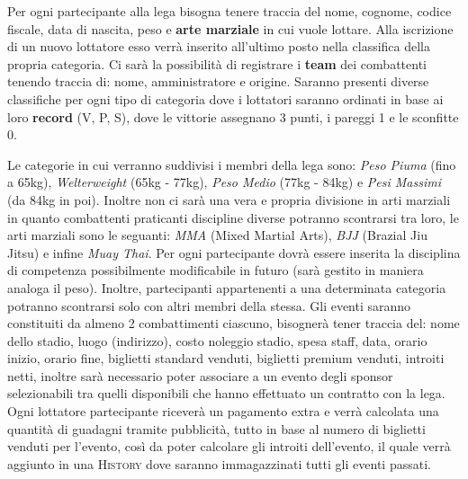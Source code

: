\documentclass[a4paper,12pt]{report}
\begin{document}
Per ogni partecipante alla lega bisogna tenere traccia del nome, cognome, codice fiscale, data di nascita, peso e \textbf{arte 
marziale} in cui vuole lottare. Alla iscrizione di un nuovo lottatore esso verrà inserito all'ultimo 
posto nella classifica della propria categoria. Ci sarà la possibilità di registrare i \textbf{team} dei combattenti tenendo traccia di: nome, amministratore e 
origine. Saranno presenti diverse classifiche per ogni tipo di categoria dove i lottatori saranno ordinati 
in base ai loro \textbf{record} (V, P, S), dove le vittorie assegnano 3 punti, i pareggi 1 e le sconfitte 0.\par
Le categorie in cui verranno suddivisi i membri della lega sono: \textit{Peso Piuma} (fino a 65kg), \textit{Welterweight} 
(65kg - 77kg), \textit{Peso Medio} (77kg - 84kg) e \textit{Pesi Massimi} (da 84kg in poi). Inoltre non ci sarà una vera e propria 
divisione in arti marziali in quanto combattenti praticanti discipline diverse potranno scontrarsi tra loro, le arti marziali sono le 
seguanti: \textit{MMA} (Mixed Martial Arts), \textit{BJJ} (Brazial Jiu Jitsu) e infine \textit{Muay Thai}. Per ogni 
partecipante dovrà essere inserita la disciplina di competenza possibilmente modificabile in futuro (sarà gestito in maniera 
analoga il peso). Inoltre, partecipanti appartenenti a una determinata categoria potranno scontrarsi solo con altri membri 
della stessa. Gli eventi saranno constituiti da almeno 2 combattimenti ciascuno, bisognerà tener traccia del: nome dello stadio, 
luogo (indirizzo), costo noleggio stadio, spesa staff, data, orario inizio, orario fine, biglietti standard venduti, biglietti 
premium venduti, introiti netti, inoltre sarà necessario poter associare a un evento degli sponsor selezionabili tra quelli disponibili 
che hanno effettuato un contratto con la lega. Ogni lottatore partecipante riceverà un pagamento extra e verrà calcolata una quantità di guadagni 
tramite pubblicità, tutto in base al numero di biglietti venduti per l'evento, così da poter calcolare gli introiti dell'evento, 
il quale verrà aggiunto in una \textsc{History} dove saranno immagazzinati tutti gli eventi passati.
\end{document}
